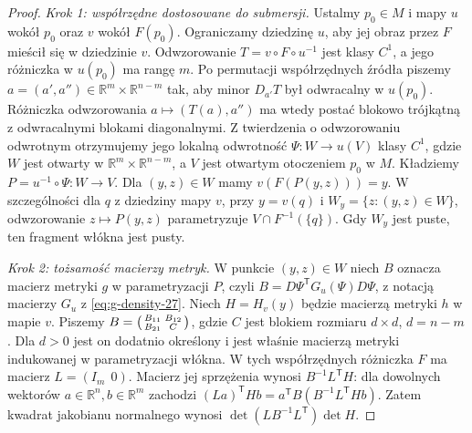 \begin{proof}
\emph{Krok 1: współrzędne dostosowane do submersji.}
Ustalmy $p_0\in M$ i mapy $u$ wokół $p_0$ oraz $v$ wokół
$F(p_0)$. Ograniczamy dziedzinę $u$, aby jej obraz przez $F$
mieścił się w dziedzinie $v$. Odwzorowanie
$T=v\circ F\circ u^{-1}$ jest klasy $C^1$, a jego różniczka
w $u(p_0)$ ma rangę $m$. Po permutacji współrzędnych
źródła piszemy $a=(a',a'')\in\mathbb R^m\times\mathbb R^{n-m}$
tak, aby minor $D_{a'}T$ był odwracalny w $u(p_0)$.
Różniczka odwzorowania $a\mapsto(T(a),a'')$
ma wtedy postać blokowo trójkątną z odwracalnymi
blokami diagonalnymi. Z twierdzenia o odwzorowaniu
odwrotnym otrzymujemy jego lokalną odwrotność
$\Psi:W\to u(V)$ klasy $C^1$, gdzie $W$ jest otwarty
w $\mathbb R^m\times\mathbb R^{n-m}$, a $V$ jest
otwartym otoczeniem $p_0$ w $M$.
Kładziemy $P=u^{-1}\circ\Psi:W\to V$.
Dla $(y,z)\in W$ mamy $v(F(P(y,z)))=y$.
W szczególności dla $q$ z dziedziny mapy $v$,
przy $y=v(q)$ i $W_y=\{z:(y,z)\in W\}$,
odwzorowanie $z\mapsto P(y,z)$ parametryzuje
$V\cap F^{-1}(\{q\})$. Gdy $W_y$ jest puste,
ten fragment włókna jest pusty.

\emph{Krok 2: tożsamość macierzy metryk.}
W punkcie $(y,z)\in W$ niech $B$ oznacza macierz
metryki $g$ w parametryzacji $P$, czyli
$B=D\Psi^{\mathsf T}G_u(\Psi)D\Psi$, z notacją
macierzy $G_u$ z \eqref{eq:g-density-27}.
Niech $H=H_v(y)$ będzie macierzą metryki $h$
w mapie $v$. Piszemy
$B=\begin{psmallmatrix}B_{11}&B_{12}\\B_{21}&C\end{psmallmatrix}$,
gdzie $C$ jest blokiem rozmiaru $d\times d$, $d=n-m$.
Dla $d>0$ jest on dodatnio określony i jest właśnie
macierzą metryki indukowanej w parametryzacji włókna.
W tych współrzędnych różniczka $F$ ma macierz
$L=(I_m\ \ 0)$. Macierz jej sprzężenia wynosi
$B^{-1}L^{\mathsf T}H$: dla dowolnych wektorów
$a\in\mathbb R^n,b\in\mathbb R^m$ zachodzi
$(La)^{\mathsf T}Hb=a^{\mathsf T}B(B^{-1}L^{\mathsf T}Hb)$.
Zatem kwadrat jakobianu normalnego wynosi
$\det(LB^{-1}L^{\mathsf T})\det H$.


\end{proof}
